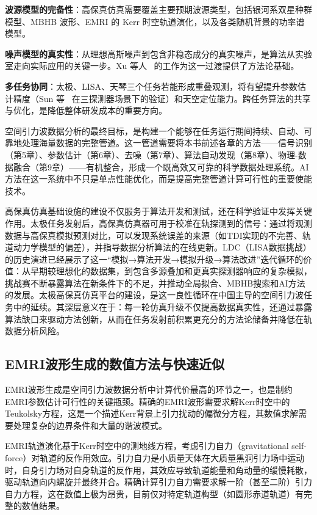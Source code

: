 \textbf{波源模型的完备性}：高保真仿真需要覆盖主要预期波源类型，包括银河系双星种群模型、MBHB 波形、EMRI 的 Kerr 时空轨道演化，以及各类随机背景的功率谱模型。

\textbf{噪声模型的真实性}：从理想高斯噪声到包含非稳态成分的真实噪声，是算法从实验室走向实际应用的关键一步。Xu 等人~\cite{xu2024nonstationarty} 的工作为这一过渡提供了方法论基础。

\textbf{多任务协同}：太极、LISA、天琴三个任务若能形成重叠观测，将有望提升参数估计精度（Sun 等~\cite{sun2025cvae} 在三探测器场景下的验证）和天空定位能力。跨任务算法的共享与优化，是降低整体研发成本的重要方向。

空间引力波数据分析的最终目标，是构建一个能够在任务运行期间持续、自动、可靠地处理海量数据的完整管道。这一管道需要将本书前述各章的方法——信号识别（第5章）、参数估计（第6章）、去噪（第7章）、算法自动发现（第8章）、物理-数据融合（第9章）——有机整合，形成一个既高效又可靠的科学数据处理系统。AI 方法在这一系统中不只是单点性能优化，而是提高完整管道计算可行性的重要使能技术。

高保真仿真基础设施的建设不仅服务于算法开发和测试，还在科学验证中发挥关键作用。太极任务发射后，高保真仿真器可用于校准在轨探测到的信号：通过将观测数据与高保真模拟预测对比，可以发现系统误差的来源（如TDI实现的不完善、轨道动力学模型的偏差），并指导数据分析算法的在线更新。LDC（LISA数据挑战）的历史演进已经展示了这一“模拟→算法开发→模拟升级→算法改进”迭代循环的价值：从早期较理想化的数据集，到包含多源叠加和更真实探测器响应的复杂模拟，挑战赛不断暴露算法在新条件下的不足，并推动全局拟合、MBHB搜索和AI方法的发展。太极高保真仿真平台的建设，是这一良性循环在中国主导的空间引力波任务中的延续。其深层意义在于：每一轮仿真升级不仅提高数据真实性，还通过暴露算法缺口来驱动方法创新，从而在任务发射前积累更充分的方法论储备并降低在轨数据分析风险。

\subsection{EMRI波形生成的数值方法与快速近似}

EMRI波形生成是空间引力波数据分析中计算代价最高的环节之一，也是制约EMRI参数估计可行性的关键瓶颈。精确的EMRI波形需要求解Kerr时空中的Teukolsky方程，这是一个描述Kerr背景上引力扰动的偏微分方程，其数值求解需要处理复杂的边界条件和大量的谐波模式。

EMRI轨道演化基于Kerr时空中的测地线方程，考虑引力自力（gravitational self-force）对轨道的反作用效应。引力自力是小质量天体在大质量黑洞引力场中运动时，自身引力场对自身轨道的反作用，其效应导致轨道能量和角动量的缓慢耗散，驱动轨道向内螺旋并最终并合。精确计算引力自力需要求解一阶（甚至二阶）引力自力方程，这在数值上极为昂贵，目前仅对特定轨道构型（如圆形赤道轨道）有完整的数值结果。

